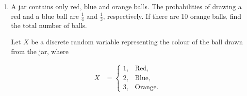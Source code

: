 \begin{enumerate}[label=\thesubsection.\arabic*, ref=\thesubsection.\theenumi]
    \[
u(n-1) =
\begin{cases}
1, & n \geq 1,\\
0, & \text{otherwise}.
\end{cases}
\]
    \par
    The term conditions give two linear equations:
    \begin{align*}
        a+13d & =2(a+7d),\qquad a+5d=-8.
    \end{align*}

    The first equation reduces to $a+d=0$, so $a=-d$. Substitution into the second equation gives
    \begin{align*}
        a+13d & =2(a+7d). \\
        a+5d  & =-8.
    \end{align*}

    The twentieth partial sum is consequently
    \begin{align*}
        S_{20} & =\frac{20}{2}\bigl(2a+19d\bigr)=10(4-38)=-340.
    \end{align*}

    The sequence generated by $(a,d)=(2,-2)$ has $t_6=-8$ and $t_{14}=-24=2t_8$, confirming both data constraints.

    The following code verifies the solution.

    \begin{lstlisting}[frame=single, basicstyle=\rmfamily, escapeinside={(*@}{@*)}]
(*@\makebox[\dimexpr\linewidth-2\fboxsep-2\fboxrule\relax][c]{10/codes/Q11.py}@*)
    \end{lstlisting}


    \item
    \label{question:C10-Q15}
    \label{question-short:C10-Q15} A jar contains only red, blue and orange balls. The probabilities of drawing a red and a blue ball are $\frac14$ and $\frac13$, respectively. If there are 10 orange balls, find the total number of balls.

    \par
    \smallskip
    \solution


	Let $X$ be a discrete random variable representing the colour of the ball drawn from the jar, where

	\begin{align*}
	X &=
	\begin{cases}
	1, & \text{Red},\\
	2, & \text{Blue},\\
	3, & \text{Orange}.
	\end{cases}
	\end{align*}


\end{enumerate}
